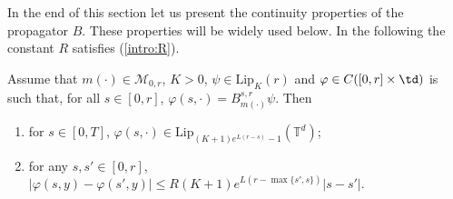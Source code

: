 \documentclass[a4paper,12pt]{article}
\begin{document}
In the end of this section let us present the continuity properties of the propagator $B$. These properties will be widely used below. 
In the following the constant $R$ satisfies (\ref{intro:R}).

\begin{lemma}\label{lm:lipschitz}
	Assume that $m(\cdot)\in\mathcal{M}_{0,r}$, $K>0$, $\psi\in \mathrm{Lip}_K(r)$ and $\varphi\in C([0,r]\times \td)$ is such that, for all $s\in [0,r]$, $\varphi(s,\cdot)=B^{s,r}_{m(\cdot)}\psi$. Then
	\begin{enumerate}
		\item for $s\in [0,T]$, $\varphi(s,\cdot)\in\mathrm{Lip}_{(K+1)e^{L(r-s)}-1}(\mathbb{T}^d)$;
		\item for any $s,s'\in [0,r]$, $|\varphi(s,y)-\varphi(s',y)|\leq  R(K+1)e^{L(r-\max\{s',s\})}|s-s'|. $
	\end{enumerate}
\end{lemma}
\end{document}
